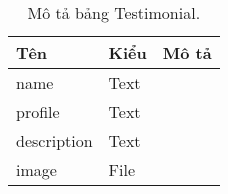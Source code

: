 \begin{table}[h!]
\begin{center}
\begin{tabular}{ |l|l|l| } 
	\hline
	Tên & Kiểu & Mô tả \\
	\hline
	name & Text & \dotfill \\
profile & Text & \dotfill \\
description & Text & \dotfill \\
image & File & \dotfill \\ 
	\hline
\end{tabular}
	\caption{Mô tả bảng Testimonial.}
	\label{table:Testimonial}
\end{center}
\end{table}
